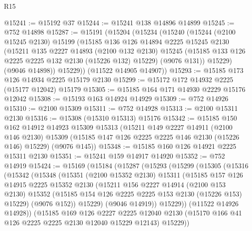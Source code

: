 \begin{lexlean}{R15}
\begin{coremodule}
@15241 := @15192 @37
@15244 := @15241 @138 @14896 @14899
@15245 := @752 @14898
@15287 := @15191
    (@15204
      (@15234
        (@15240
          (@15244
            (@2100 @15245 @2130)
            @15199
            (@15185
              @136
              @126
              @14894
              @2225
              @15245
              @2130
              (@15211
                @135
                @2227
                @14893
                (@2100 @132 @2130)
                @15245
                (@15185 @133 @126 @2225 @2225 @132 @2130 (@15226 @132) @15229)
                (@9076 @131))
              @15229)
            (@9046 @14898))
          @15229))
      (@11522 @14905 @14907))
@15293 := @15185 @173 @126 @14934 @2225 @15179 @2130
@15299 := @15172 @172 @14932 @2225 (@15177 @12042) @15179
@15305 := @15185 @164 @171 @14930 @2229 @15176 @12042
@15308 := @15193 @163 @14924 @14929
@15309 := @752 @14926
@15310 := @2100 @15309
@15311 := @752 @14928
@15313 := @2100 @15311 @2130
@15316 := @15308 (@15310 @15313) @15176
@15342 := @15185
    @150
    @162
    @14912
    @14923
    @15309
    @15313
    (@15211
      @149
      @2227
      @14911
      (@2100 @146 @2130)
      @15309
      (@15185 @147 @126 @2225 @2225 @146 @2130 (@15226 @146) @15229)
      (@9076 @145))
@15348 := @15185 @160 @126 @14921 @2225 @15311 @2130
@15351 := @15241 @159 @14917 @14920
@15352 := @752 @14919
@15424 := @15169
    (@15184
      (@15287
        (@15293
          (@15299
            (@15305
              (@15316
                (@15342
                  (@15348
                    (@15351
                      (@2100 @15352 @2130)
                      @15311
                      (@15185
                        @157
                        @126
                        @14915
                        @2225
                        @15352
                        @2130
                        (@15211
                          @156
                          @2227
                          @14914
                          (@2100 @153 @2130)
                          @15352
                          (@15185 @154 @126 @2225 @2225 @153 @2130 (@15226 @153) @15229)
                          (@9076 @152))
                        @15229)
                      (@9046 @14919))
                    @15229))
                (@11522 @14926 @14928))
              (@15185
                @169
                @126
                @2227
                @2225
                @12040
                @2130
                (@15170 @166 @41 @126 @2225 @2225 @2130 @12040 @15229 @12143)
                @15229))

\end{coremodule}
\end{lexlean}
